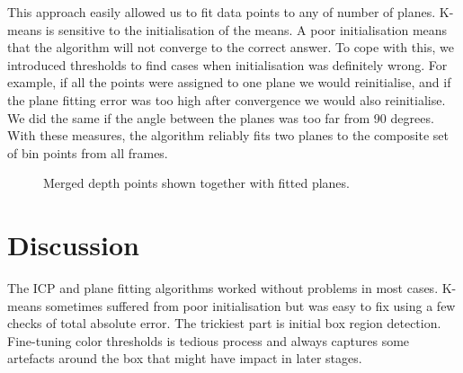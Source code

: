\documentclass[12pt,a4paper,onecolumn]{article}
\begin{document}
This approach easily allowed us to fit data points to any of number of
planes.  K-means is sensitive to the initialisation of the means.  A poor initialisation means that the algorithm will not converge to the correct answer.  To cope with this, we introduced thresholds
to find cases when initialisation was definitely wrong.  For example, if all the points were assigned to one plane we would reinitialise, and if the plane fitting error was too high after convergence we would also reinitialise.  We did the same if the angle between the planes was too far from 90 degrees.  With these measures, the algorithm reliably fits two planes to the composite set of bin points from all frames.

\begin{figure}[h]
    \centering
      \caption{Merged depth points shown together with fitted planes.}
\end{figure}

\section{Discussion}
The ICP and plane fitting algorithms worked without problems in most cases. K-means sometimes suffered
from poor initialisation but was easy to 
fix using a few checks of total
absolute error. The trickiest part is initial box
region detection. Fine-tuning color thresholds is tedious
process and always captures some artefacts around the box
that might have impact in later stages.
\end{document}
